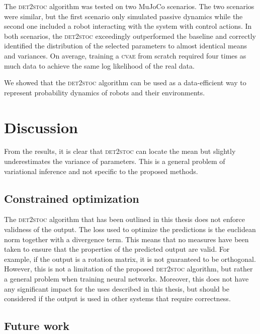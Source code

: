 \documentclass{kththesis}
\newcommand{\cvae}{\textsc{cvae}}
\newcommand{\dettostoc}{\textsc{det2stoc}}
\begin{document}
The \dettostoc{} algorithm was tested on two MuJoCo scenarios. The two scenarios were similar, but the first scenario only simulated passive dynamics while the second one included a robot interacting with the system with control actions. In both scenarios, the \dettostoc{} exceedingly outperformed the baseline and correctly identified the distribution of the selected parameters to almost identical means and variances. On average, training a \cvae{} from scratch required four times as much data to achieve the same log likelihood of the real data.

We showed that the \dettostoc{} algorithm can be used as a data-efficient way to represent probability dynamics of robots and their environments.

\section{Discussion}

From the results, it is clear that \dettostoc{} can locate the mean but slightly underestimates the variance of parameters. This is a general problem of variational inference \parencite{bishop:2006:PRML} and not specific to the proposed methods.

\subsection{Constrained optimization}

The \dettostoc{} algorithm that has been outlined in this thesis does not enforce validness of the output. The loss used to optimize the predictions is the euclidean norm together with a divergence term. This means that no measures have been taken to ensure that the properties of the predicted output are valid. For example, if the output is a rotation matrix, it is not guaranteed to be orthogonal. However, this is not a limitation of the proposed \dettostoc{} algorithm, but rather a general problem when training neural networks. Moreover, this does not have any significant impact for the uses described in this thesis, but should be considered if the output is used in other systems that require correctness. %

\subsection{Future work}
\end{document}
